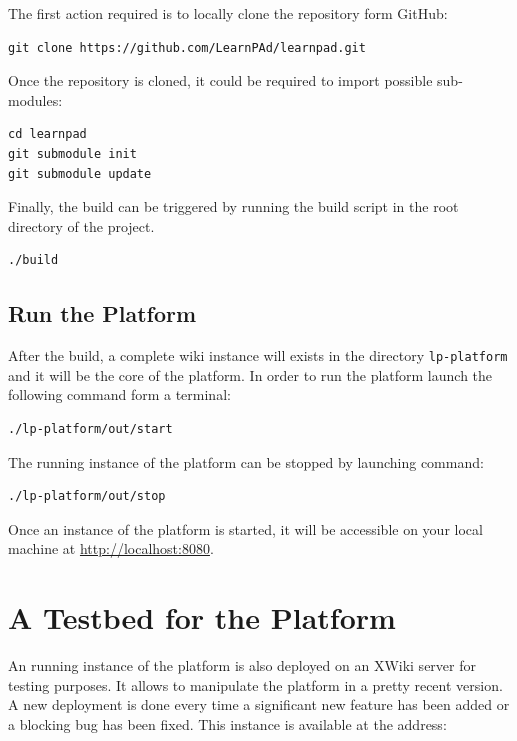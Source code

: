 \documentclass{learnpad}
\begin{document}
The first action required is to locally clone the \learnpad
repository form GitHub:

\begin{lstlisting}[style=javaCode, breaklines]
git clone https://github.com/LearnPAd/learnpad.git
\end{lstlisting}

Once the repository is cloned, it could be required to import 
possible sub-modules:

\begin{lstlisting}[style=javaCode, breaklines]
cd learnpad
git submodule init
git submodule update
\end{lstlisting}

Finally, the build can be triggered by running the build script in the 
root directory of the project.

\begin{lstlisting}[style=javaCode, breaklines]
./build
\end{lstlisting}

\section{Run the Platform}
\label{sec:run}

After the build, a complete wiki instance will exists in the directory 
\texttt{lp-platform} and it will be the core of the platform. In order to run
the platform launch the following command form a terminal:

\begin{lstlisting}[style=javaCode, breaklines]
./lp-platform/out/start
\end{lstlisting}

The running instance of the platform can be stopped by launching command:

\begin{lstlisting}[style=javaCode, breaklines]
./lp-platform/out/stop
\end{lstlisting}

Once an instance of the \learnpad platform is started, it will be accessible on 
your local machine at \url{http://localhost:8080}.


\chapter{A Testbed for the \learnpad Platform}
\label{ch:testbed}

An running instance of the \learnpad platform is also deployed on an XWiki 
server for testing purposes.  It allows to manipulate the platform in a pretty 
recent version.  A new deployment is done every time a significant new feature 
has been added or a blocking bug has been fixed. This instance is available 
at the address:
\end{document}
